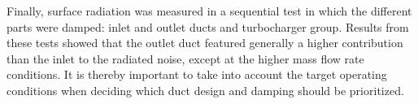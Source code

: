 Finally, surface radiation was measured in a sequential test in which the different parts were damped: inlet and outlet ducts and turbocharger group. Results from these tests showed that the outlet duct featured generally a higher contribution than the inlet to the radiated noise, except at the higher mass flow rate conditions. It is thereby important to take into account the target operating conditions when deciding which duct design and damping should be prioritized.